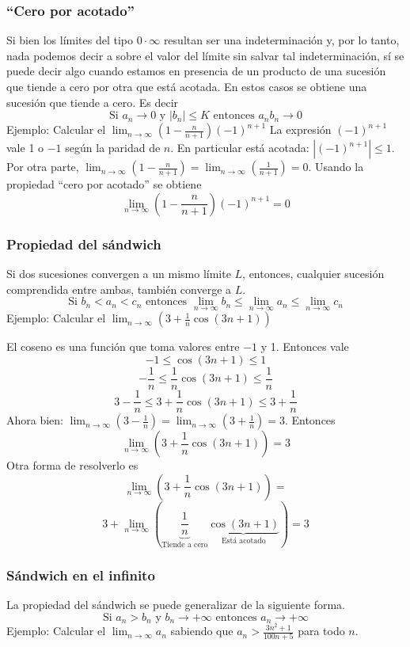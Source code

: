 \documentclass[../teoria.root.tex]{subfiles}
\begin{document}
\subsubsection{``Cero por acotado''}
Si bien los límites del tipo \(0\cdot\infty\) resultan ser una indeterminación y, por lo tanto, nada podemos decir a sobre el valor del límite sin salvar tal indeterminación, sí se puede decir algo cuando estamos en presencia de un producto de una sucesión que tiende a cero por otra que está acotada.
En estos casos se obtiene una sucesión que tiende a cero.
Es decir \[\text{Si }a_n\rightarrow0\text{ y }|b_n|\leq K\text{ entonces }a_nb_n\rightarrow0\]
Ejemplo: Calcular el \(\lim_{n\to\infty}\left(1-\frac{n}{n+1}\right)(-1)^{n+1}\)
La expresión \((-1)^{n+1}\) vale 1 o \(-1\) según la paridad de \(n\).
En particular está acotada: \(|(-1)^{n+1}|\leq1\).
Por otra parte, \(\lim_{n\to\infty}\left(1-\frac{n}{n+1}\right)=\lim_{n\to\infty}\left(\frac{1}{n+1}\right)=0\).
Usando la propiedad ``cero por acotado'' se obtiene
\[\lim_{n\to\infty}\left(1-\frac{n}{n+1}\right)(-1)^{n+1}=0\]
\subsubsection{Propiedad del sándwich}
Si dos sucesiones convergen a un mismo límite \(L\), entonces, cualquier sucesión comprendida entre ambas, también converge a \(L\).
\[\text{Si }b_n<a_n<c_n\text{ entonces }\lim_{n\to\infty}b_n\leq\lim_{n\to\infty}a_n\leq\lim_{n\to\infty}c_n\]
Ejemplo: Calcular el \(\lim_{n\to\infty}\left(3+\frac{1}{n}\cos(3n+1)\right)\)

El coseno es una función que toma valores entre \(-1\) y 1.
Entonces vale
\[-1\leq\cos(3n+1)\leq1\]
\[-\frac{1}{n}\leq\frac{1}{n}\cos(3n+1)\leq\frac{1}{n}\]
\[3-\frac{1}{n}\leq3+\frac{1}{n}\cos(3n+1)\leq3+\frac{1}{n}\]
Ahora bien: \(\lim_{n\to\infty}\left(3-\frac{1}{n}\right)=\lim_{n\to\infty}\left(3+\frac{1}{n}\right)=3\).
Entonces \[\lim_{n\to\infty}\left(3+\frac{1}{n}\cos(3n+1)\right)=3\]
Otra forma de resolverlo es
\[\lim_{n\to\infty}\left(3+\frac{1}{n}\cos(3n+1)\right)=\]
\[3+\lim_{n\to\infty}\left(\underbrace{\frac{1}{n}}_{\text{Tiende a cero}}\underbrace{\cos(3n+1)}_{\text{Está acotado}}\right)=3\]
\subsubsection{Sándwich en el infinito}
La propiedad del sándwich se puede generalizar de la siguiente forma.
\[\text{Si }a_n>b_n\text{ y }b_n\rightarrow+\infty\text{ entonces }a_n\rightarrow+\infty\]
Ejemplo: Calcular el \(\lim_{n\to\infty}a_n\) sabiendo que \(a_n>\frac{3n^2+1}{100n+5}\) para todo \(n\).
\end{document}
